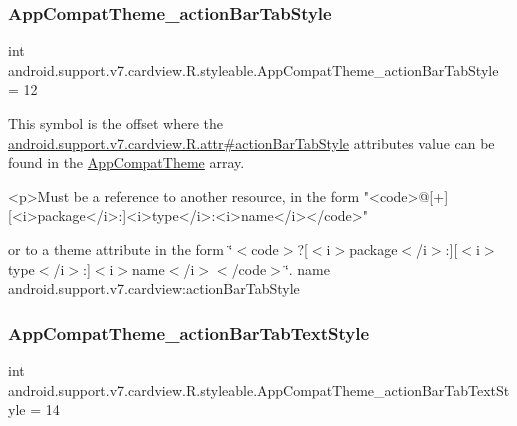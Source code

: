 \subsubsection{\texorpdfstring{App\+Compat\+Theme\+\_\+action\+Bar\+Tab\+Style}{AppCompatTheme\_actionBarTabStyle}}
{\footnotesize\ttfamily int android.\+support.\+v7.\+cardview.\+R.\+styleable.\+App\+Compat\+Theme\+\_\+action\+Bar\+Tab\+Style = 12\hspace{0.3cm}{\ttfamily [static]}}

This symbol is the offset where the \hyperlink{classandroid_1_1support_1_1v7_1_1cardview_1_1R_1_1attr_abb2876dd6a1fbbb1ffa524f17eb9cf2c}{android.\+support.\+v7.\+cardview.\+R.\+attr\#action\+Bar\+Tab\+Style} attribute\textquotesingle{}s value can be found in the \hyperlink{classandroid_1_1support_1_1v7_1_1cardview_1_1R_1_1styleable_a52e6f69f954ecc2622d72c0b4d298938}{App\+Compat\+Theme} array.

\begin{DoxyVerb}      <p>Must be a reference to another resource, in the form "<code>@[+][<i>package</i>:]<i>type</i>:<i>name</i></code>"
\end{DoxyVerb}
 or to a theme attribute in the form \char`\"{}$<$code$>$?\mbox{[}$<$i$>$package$<$/i$>$\+:\mbox{]}\mbox{[}$<$i$>$type$<$/i$>$\+:\mbox{]}$<$i$>$name$<$/i$>$$<$/code$>$\char`\"{}.  name android.\+support.\+v7.\+cardview\+:action\+Bar\+Tab\+Style \mbox{\label{classandroid_1_1support_1_1v7_1_1cardview_1_1R_1_1styleable_a918e33615d661042e8d857f74c194f01}} 
\subsubsection{\texorpdfstring{App\+Compat\+Theme\+\_\+action\+Bar\+Tab\+Text\+Style}{AppCompatTheme\_actionBarTabTextStyle}}
{\footnotesize\ttfamily int android.\+support.\+v7.\+cardview.\+R.\+styleable.\+App\+Compat\+Theme\+\_\+action\+Bar\+Tab\+Text\+Style = 14\hspace{0.3cm}{\ttfamily [static]}}

